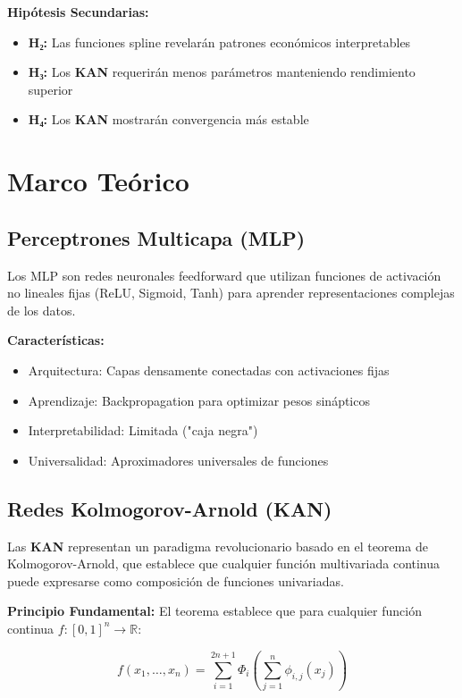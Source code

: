 \documentclass[10pt,twocolumn]{article}
\newcommand{\kan}{\textbf{KAN}}
\begin{document}
\textbf{Hipótesis Secundarias:}
\begin{itemize}
    \item \textbf{H₂:} Las funciones spline revelarán patrones económicos interpretables
    \item \textbf{H₃:} Los \kan{} requerirán menos parámetros manteniendo rendimiento superior
    \item \textbf{H₄:} Los \kan{} mostrarán convergencia más estable
\end{itemize}

\section{Marco Teórico}

\subsection{Perceptrones Multicapa (MLP)}

Los MLP son redes neuronales feedforward que utilizan funciones de activación no lineales fijas (ReLU, Sigmoid, Tanh) para aprender representaciones complejas de los datos.

\textbf{Características:}
\begin{itemize}
    \item Arquitectura: Capas densamente conectadas con activaciones fijas
    \item Aprendizaje: Backpropagation para optimizar pesos sinápticos
    \item Interpretabilidad: Limitada ("caja negra")
    \item Universalidad: Aproximadores universales de funciones
\end{itemize}

\subsection{Redes Kolmogorov-Arnold (KAN)}

Las \kan{} representan un paradigma revolucionario basado en el teorema de Kolmogorov-Arnold, que establece que cualquier función multivariada continua puede expresarse como composición de funciones univariadas.

\textbf{Principio Fundamental:}
El teorema establece que para cualquier función continua $f: [0,1]^n \to \mathbb{R}$:

\begin{equation}
f(x_1, \ldots, x_n) = \sum_{i=1}^{2n+1} \Phi_i\left(\sum_{j=1}^n \phi_{i,j}(x_j)\right)
\end{equation}
\end{document}
